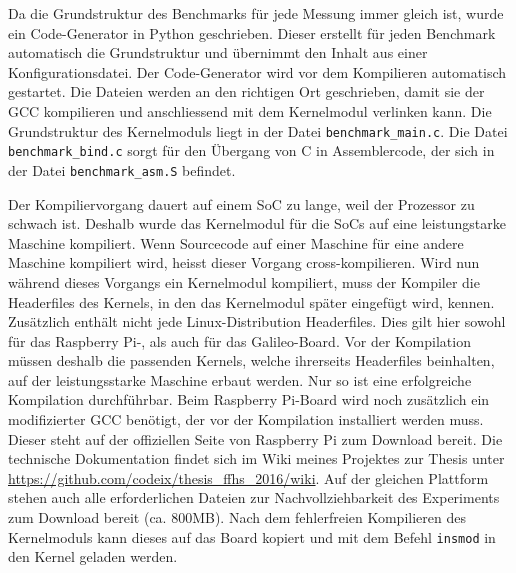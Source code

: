 Da die Grundstruktur des Benchmarks für jede Messung immer gleich ist, wurde ein Code-Generator in Python geschrieben. Dieser erstellt für jeden Benchmark automatisch die Grundstruktur und übernimmt den Inhalt aus einer Konfigurationsdatei. Der Code-Generator wird vor dem Kompilieren automatisch gestartet. Die Dateien werden an den richtigen Ort geschrieben, damit sie der GCC kompilieren und anschliessend mit dem Kernelmodul verlinken kann. Die Grundstruktur des Kernelmoduls liegt in der Datei \texttt{benchmark\_main.c}. Die Datei \texttt{benchmark\_bind.c} sorgt für den Übergang von C in Assemblercode, der sich in der Datei \texttt{benchmark\_asm.S} befindet.
\par
Der Kompiliervorgang dauert auf einem SoC zu lange, weil der Prozessor zu schwach ist. Deshalb wurde das Kernelmodul für die SoCs auf eine leistungstarke Maschine kompiliert. Wenn Sourcecode auf einer Maschine für eine andere Maschine kompiliert wird, heisst dieser Vorgang cross-kompilieren. Wird nun während dieses Vorgangs ein Kernelmodul kompiliert, muss der Kompiler die Headerfiles des Kernels, in den das Kernelmodul später eingefügt wird, kennen. Zusätzlich enthält nicht jede Linux-Distribution Headerfiles. Dies gilt hier sowohl für das Raspberry Pi-, als auch für das Galileo-Board. Vor der Kompilation müssen deshalb die passenden Kernels, welche ihrerseits Headerfiles beinhalten, auf der leistungsstarke Maschine erbaut werden. Nur so ist eine erfolgreiche Kompilation durchführbar. Beim Raspberry Pi-Board wird noch zusätzlich ein modifizierter GCC benötigt, der vor der Kompilation installiert werden muss. Dieser steht auf der offiziellen Seite von Raspberry Pi zum Download bereit. Die technische Dokumentation findet sich im Wiki meines Projektes zur Thesis unter \url{https://github.com/codeix/thesis_ffhs_2016/wiki}. Auf der gleichen Plattform stehen auch alle erforderlichen Dateien zur Nachvollziehbarkeit des Experiments zum Download bereit (ca. 800MB). Nach dem fehlerfreien Kompilieren des Kernelmoduls kann dieses auf das Board kopiert und mit dem Befehl \texttt{insmod} in den Kernel geladen werden.


